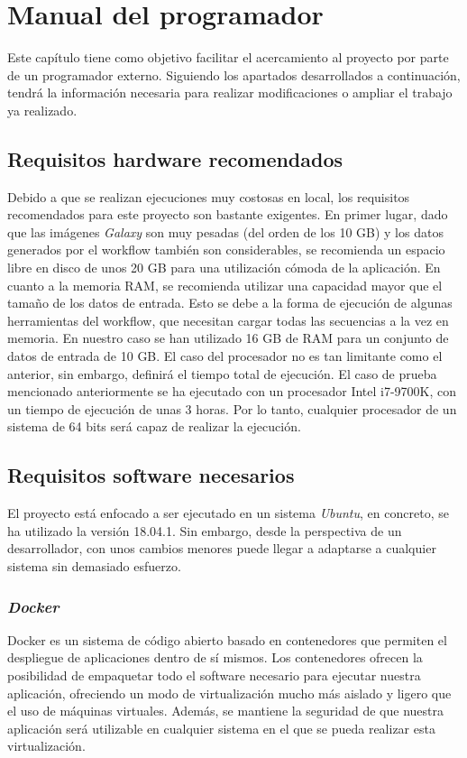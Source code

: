 \chapter{Manual del programador}
\label{Anexo:ManualProgramador}
Este capítulo tiene como objetivo facilitar el acercamiento al proyecto por parte de un programador externo. Siguiendo los apartados desarrollados a continuación, tendrá la información necesaria para realizar modificaciones o ampliar el trabajo ya realizado.

\section{Requisitos hardware recomendados}
Debido a que se realizan ejecuciones muy costosas en local, los requisitos recomendados para este proyecto son bastante exigentes.
En primer lugar, dado que las imágenes \textit{Galaxy} son muy pesadas (del orden de los 10 GB) y los datos generados por el workflow también son considerables, se recomienda un espacio libre en disco de unos 20 GB para una utilización cómoda de la aplicación.
En cuanto a la memoria RAM, se recomienda utilizar una capacidad mayor que el tamaño de los datos de entrada. Esto se debe a la forma de ejecución de algunas herramientas del workflow, que necesitan cargar todas las secuencias a la vez en memoria. En nuestro caso se han utilizado 16 GB de RAM para un conjunto de datos de entrada de 10 GB.
El caso del procesador no es tan limitante como el anterior, sin embargo, definirá el tiempo total de ejecución. El caso de prueba mencionado anteriormente se ha ejecutado con un procesador Intel i7-9700K, con un tiempo de ejecución de unas 3 horas. Por lo tanto, cualquier procesador de un sistema de 64 bits será capaz de realizar la ejecución.

\section{Requisitos software necesarios}
El proyecto está enfocado a ser ejecutado en un sistema \textit{Ubuntu}, en concreto, se ha utilizado la versión 18.04.1. Sin embargo, desde la perspectiva de un desarrollador, con unos cambios menores puede llegar a adaptarse a cualquier sistema sin demasiado esfuerzo.
    \subsection{\textit{Docker}}
    Docker es un sistema de código abierto basado en contenedores que permiten el despliegue de aplicaciones dentro de sí mismos. Los contenedores ofrecen la posibilidad de empaquetar todo el software necesario para ejecutar nuestra aplicación, ofreciendo un modo de virtualización mucho más aislado y ligero que el uso de máquinas virtuales. Además, se mantiene la seguridad de que nuestra aplicación será utilizable en cualquier sistema en el que se pueda realizar esta virtualización.
    
